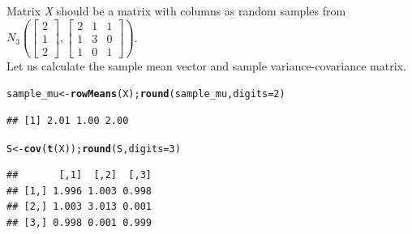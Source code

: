 \documentclass[11pt, a4paper]{article}\usepackage[]{graphicx}\usepackage[]{xcolor}
\makeatletter
\newcommand{\hlnum}[1]{\textcolor[rgb]{0.686,0.059,0.569}{#1}}%
\newcommand{\hldef}[1]{\textcolor[rgb]{0.345,0.345,0.345}{#1}}%
\newcommand{\hlkwb}[1]{\textcolor[rgb]{0.69,0.353,0.396}{#1}}%
\newcommand{\hlkwc}[1]{\textcolor[rgb]{0.333,0.667,0.333}{#1}}%
\newcommand{\hlkwd}[1]{\textcolor[rgb]{0.737,0.353,0.396}{\textbf{#1}}}%
\newenvironment{kframe}{%
 \def\at@end@of@kframe{}%
 \ifinner\ifhmode%
  \def\at@end@of@kframe{\end{minipage}}%
  \begin{minipage}{\columnwidth}%
 \fi\fi%
 \def\FrameCommand##1{\hskip\@totalleftmargin \hskip-\fboxsep
 \colorbox{shadecolor}{##1}\hskip-\fboxsep
     \hskip-\linewidth \hskip-\@totalleftmargin \hskip\columnwidth}%
 \MakeFramed {\advance\hsize-\width
   \@totalleftmargin\z@ \linewidth\hsize
   \@setminipage}}%
 {\par\unskip\endMakeFramed%
 \at@end@of@kframe}
\newenvironment{knitrout}{}{} %
\makeatother
\begin{document}
Matrix \textit{X} should be a matrix with columns as random samples from $N_3 \left( \begin{bmatrix} 2 \\ 1 \\ 2 \end{bmatrix}, \begin{bmatrix} 2 & 1 & 1 \\ 1 & 3 & 0 \\ 1 & 0 & 1 \end{bmatrix} \right)$. \\[0.5em]

Let us calculate the sample mean vector and sample variance-covariance matrix.

\begin{knitrout}
\color{fgcolor}\begin{kframe}
\begin{alltt}
\hldef{sample_mu} \hlkwb{<-} \hlkwd{rowMeans}\hldef{(X);} \hlkwd{round}\hldef{(sample_mu,} \hlkwc{digits} \hldef{=} \hlnum{2}\hldef{)}
\end{alltt}
\begin{verbatim}
## [1] 2.01 1.00 2.00
\end{verbatim}
\end{kframe}
\end{knitrout}

\begin{knitrout}
\color{fgcolor}\begin{kframe}
\begin{alltt}
\hldef{S} \hlkwb{<-} \hlkwd{cov}\hldef{(}\hlkwd{t}\hldef{(X));} \hlkwd{round}\hldef{(S,} \hlkwc{digits} \hldef{=} \hlnum{3}\hldef{)}
\end{alltt}
\begin{verbatim}
##       [,1]  [,2]  [,3]
## [1,] 1.996 1.003 0.998
## [2,] 1.003 3.013 0.001
## [3,] 0.998 0.001 0.999
\end{verbatim}
\end{kframe}
\end{knitrout}

\end{document}

